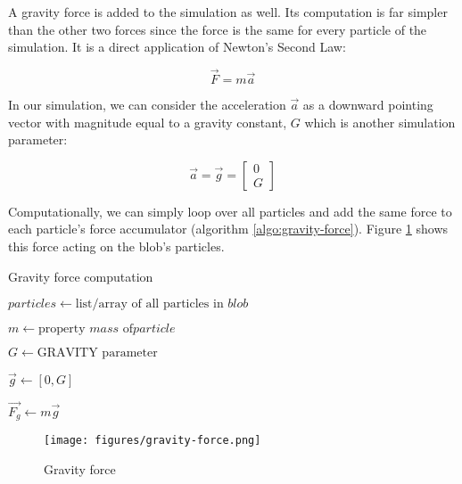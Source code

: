 \documentclass[manuscript, screen]{timtm}
\begin{document}
A gravity force is added to the simulation as well. Its computation is far simpler than the other two forces since the force is the same for every particle of the simulation. It is a direct application of Newton's Second Law:

\[ \vec{F} = m\vec{a}\]

In our simulation, we can consider the acceleration $\vec{a}$ as a downward pointing vector with magnitude equal to a gravity constant, $G$ which is another simulation parameter:

\[
\vec{a} = \vec{g} = \begin{bmatrix} 0 \\ G \end{bmatrix}
\]

Computationally, we can simply loop over all particles and add the same force to each particle's force accumulator (algorithm \ref{algo:gravity-force}). Figure \ref{fig:gravity-force} shows this force acting on the blob's particles.

\begin{algorithm}
\caption{Gravity force computation} \label{algo:gravity-force}
\begin{algorithmic}[1]

    
    \State $particles \gets \text{list/array of all particles in } blob$


        \State $m \gets \text{property $mass$ of} particle$

        \State $G \gets \text{GRAVITY parameter}$

        \State $\vec{g} \gets [0, G]$

        \State $\vec{F_g} \gets m\vec{g}$

        \State {}
        
    \EndFor
\EndFor
\end{algorithmic}
\end{algorithm}

\begin{figure}[h]
  \centering
  \texttt{[image: figures/gravity-force.png]}
  \caption{Gravity force}
  \label{fig:gravity-force}
\end{figure}
\end{document}
